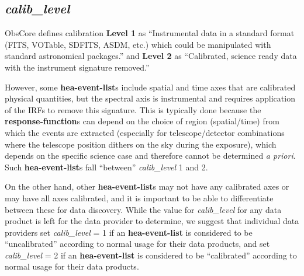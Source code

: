 \documentclass[11pt,a4paper]{ivoa}
\newcommand{\TODO}[1]{%
    \noindent%
    \colorbox{green}{%
            \parbox{0.85\linewidth}{\sffamily \textbf{TODO:}\\
            #1}
    }%
    \vspace{2pt}
}
\begin{document}

\subsection{{\em calib\_level}}

ObsCore defines calibration {\bf Level 1} as ``Instrumental data in a standard format (FITS, VOTable, SDFITS, ASDM, etc.) which could be manipulated with standard astronomical packages.'' and {\bf Level 2} as ``Calibrated, science ready data with the instrument signature removed.''

However, some {\bf hea-event-list}s include spatial and time axes that are calibrated physical quantities, but the spectral axis is instrumental and requires application of the IRFs to remove this signature. This is typically done because the {\bf response-function}s can depend on the choice of region (spatial/time) from which the events are extracted (especially for telescope/detector combinations where the telescope position dithers on the sky during the exposure), which depends on the specific science case and therefore cannot be determined {\em a priori\/}.  Such {\bf hea-event-list}s fall ``between'' {\em calib\_level\/} 1 and 2.

On the other hand, other {\bf hea-event-list}s may not have any calibrated axes or may have all axes calibrated, and it is important to be able to differentiate between these for data discovery.  While the value for {\em calib\_level\/} for any data product is left for the data provider to determine, we suggest that individual data providers set {\em calib\_level\/} = 1 if an {\bf hea-event-list} is considered to be ``uncalibrated'' according to normal usage for their data products, and set {\em calib\_level\/} = 2 if an {\bf hea-event-list} is considered to be ``calibrated'' according to normal usage for their data products.
\end{document}
